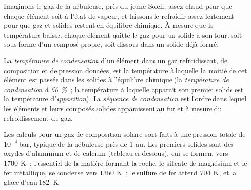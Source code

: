 Imaginons le gaz de la nébuleuse, près du jeune Soleil, assez chaud pour que chaque
élément soit à l'état de vapeur, et laissons-le refroidir assez lentement pour que gaz
et solides restent en équilibre chimique. À mesure que la température baisse, chaque
élément quitte le gaz pour un solide à son tour, soit sous forme d'un composé propre,
soit dissous dans un solide déjà formé.

\begin{definition}
\label{def:b2:planet-formation-meteorites:condensation}
La \emph{température de condensation} d'un élément dans un
gaz refroidissant, de composition et de pression données, est la température à laquelle la
moitié de cet élément est passée dans les solides à l'équilibre chimique (la \emph{température
de condensation à 50~\%}~; la température à laquelle apparaît son premier solide est la
température d'\emph{apparition}). La \emph{séquence de
condensation} est l'ordre dans lequel les éléments et leurs
composés solides apparaissent au fur et à mesure du refroidissement du gaz.
\end{definition}

Les calculs pour un gaz de composition solaire sont faits à une pression totale de
$10^{-4}$ bar, typique de la nébuleuse près de \qty{1}{au}. Les premiers solides sont
des oxydes d'aluminium et de calcium (tableau ci-dessous), qui se forment vers
\qty{1700}{K}~; l'essentiel de la matière formant la roche, le silicate de magnésium et
le fer métallique, se condense vers \qty{1350}{K}~; le sulfure de fer attend
\qty{704}{K}, et la glace d'eau \qty{182}{K}.

